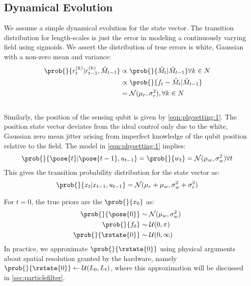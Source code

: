  \subsection{Dynamical Evolution}
 We assume a simple dynamical evolution for the state vector. The transition distribution for length-scales is just the error in modeling a continuously varying field using sigmoids. We assert the distribution of true errors is white, Gaussian with a non-zero mean and variance:
 \begin{align}
 \prob{}{ r_t^{(k)} |  r_{t-1}^{(k)} , \hat{M}_{t-1}}  & \propto    \prob{}{ \hat{M}_{t} |  \hat{M}_{t-1}}  \forall k \in N \label{eqn:slam:dynamics:r:1} \\
 & \propto \prob{}{ f_t - \hat{M}_{t} |  \hat{M}_{t-1}} \label{eqn:slam:dynamics:r:2}\\
 & = \mathcal{N}(\mu_r, \sigma^2_r),\forall k \in N \label{eqn:slam:dynamics:r:3}
 \end{align}\\
 Similarly, the position of the sensing qubit is given by \cref{eqn:physetting:1}. The position state vector deviates from the ideal control only due to the white, Gaussian zero mean jitter arising from imperfect knowledge of the qubit position relative to the field. The model in \cref{eqn:physetting:1}  implies:
 \begin{align}
 \prob{}{ \pose{t}| \pose{t-1}, u_{t-1}} = \prob{}{ w_t} = \mathcal{N}(\mu_w, \sigma^2_w) \forall t \label{eqn:slam:dynamics:process}
 \end{align} 
 This gives the transition probability distribution for the state vector as:
 \begin{align}
 \prob{}{x_{t}| x_{t-1}, u_{t-1}} = \mathcal{N}(\mu_r + \mu_w, \sigma^2_w + \sigma^2_r) \label{eqn:slam:dynamics:full}
 \end{align}

 For $t=0$, the true priors are the $\prob{}{x_{0}}$ as:
  \begin{align}
  	\prob{}{\pose{0}} & \sim \mathcal{N}(\mu_w, \sigma^2_w) \\
  	\prob{}{ f_{0}} & \sim \mathcal{U}(0, \pi) \label{eqn:prior}\\
  	\prob{}{ \rstate{0}} & \sim \mathcal{U}(0, \infty) 
 \end{align}
 In practice, we approximate $\prob{}{ \rstate{0}}$ using physical arguments about spatial resolution granted by the hardware, namely $\prob{}{ \rstate{0}} \leftarrow \mathcal{U}(L_0, L_t)$, where this approximation will be discussed in \cref{sec:particlefilter}.
 
